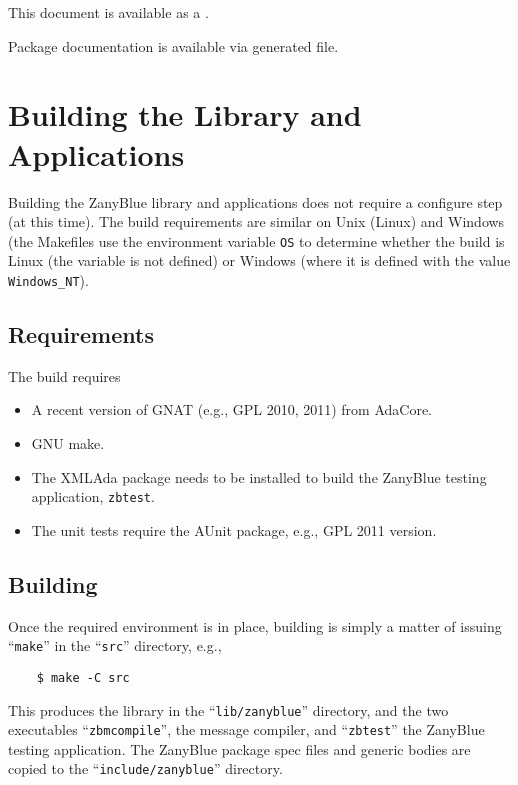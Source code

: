 \begin{htmlonly}
This document is available as a
.

Package documentation is available via
 generated file.
\end{htmlonly}

\section{Building the Library and Applications}

Building the ZanyBlue library and applications does not require a configure
step (at this time).  The build requirements are similar on Unix (Linux)
and Windows (the Makefiles use the environment variable \verb|OS| to determine
whether the build is Linux (the variable is not defined) or Windows (where it
is defined with the value \verb|Windows_NT|).

\subsection{Requirements}

The build requires
\begin{itemize}
\item A recent version of GNAT (e.g., GPL 2010, 2011) from AdaCore.
\item GNU make.
\item The XMLAda package needs to be installed to build the ZanyBlue
      testing application, \texttt{zbtest}.
\item The unit tests require the AUnit package, e.g., GPL 2011 version.
\end{itemize}

\subsection{Building}

Once the required environment is in place, building is simply a matter of
issuing ``\texttt{make}'' in the ``\texttt{src}'' directory, e.g.,
\begin{small}
\begin{verbatim}
    $ make -C src
\end{verbatim}
\end{small}
This produces the library in the ``\texttt{lib/zanyblue}'' directory,
and the two executables ``\texttt{zbmcompile}'', the message compiler,
and ``\texttt{zbtest}'' the ZanyBlue testing application.  The ZanyBlue
package spec files and generic bodies are copied to the
``\texttt{include/zanyblue}'' directory.

